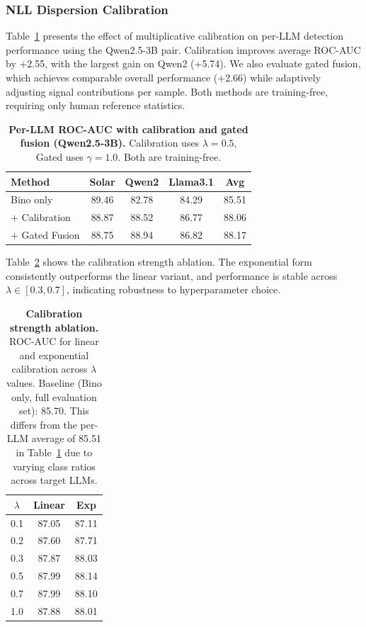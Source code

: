 \documentclass{article}
\begin{document}
\subsubsection{NLL Dispersion Calibration}

Table~\ref{tab:calibration_llm} presents the effect of multiplicative calibration on per-LLM detection performance using the Qwen2.5-3B pair. Calibration improves average ROC-AUC by +2.55, with the largest gain on Qwen2 (+5.74). We also evaluate gated fusion, which achieves comparable overall performance (+2.66) while adaptively adjusting signal contributions per sample. Both methods are training-free, requiring only human reference statistics.

\begin{table}[h]
\centering
\caption{\textbf{Per-LLM ROC-AUC with calibration and gated fusion (Qwen2.5-3B).} Calibration uses $\lambda = 0.5$, Gated uses $\gamma = 1.0$. Both are training-free.}
\label{tab:calibration_llm}
\begin{tabular}{lcccc}
\toprule
Method & Solar & Qwen2 & Llama3.1 & Avg \\
\midrule
Bino only & 89.46 & 82.78 & 84.29 & 85.51 \\
+ Calibration & 88.87 & 88.52 & 86.77 & 88.06 \\
+ Gated Fusion & 88.75 & 88.94 & 86.82 & 88.17 \\
\bottomrule
\end{tabular}
\end{table}

Table~\ref{tab:lambda} shows the calibration strength ablation. The exponential form consistently outperforms the linear variant, and performance is stable across $\lambda \in [0.3, 0.7]$, indicating robustness to hyperparameter choice.

\begin{table}[h]
\centering
\caption{\textbf{Calibration strength ablation.} ROC-AUC for linear and exponential calibration across $\lambda$ values. Baseline (Bino only, full evaluation set): 85.70. This differs from the per-LLM average of 85.51 in Table~\ref{tab:calibration_llm} due to varying class ratios across target LLMs.}
\label{tab:lambda}
\begin{tabular}{ccc}
\toprule
$\lambda$ & Linear & Exp \\
\midrule
0.1 & 87.05 & 87.11 \\
0.2 & 87.60 & 87.71 \\
0.3 & 87.87 & 88.03 \\
0.5 & 87.99 & 88.14 \\
0.7 & 87.99 & 88.10 \\
1.0 & 87.88 & 88.01 \\
\bottomrule
\end{tabular}
\end{table}
\end{document}
